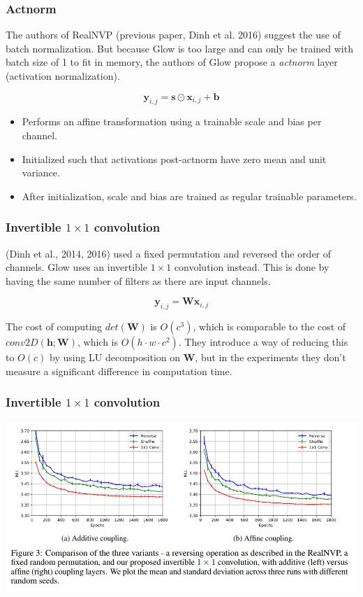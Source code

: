 \documentclass{beamer}
\begin{document}
\begin{frame}
  \frametitle{Actnorm}

  The authors of RealNVP (previous paper, Dinh et al. 2016) suggest the use of
  batch normalization. But because Glow is too large and can only be trained
  with batch size of 1 to fit in memory, the authors of Glow propose a
  \emph{actnorm} layer (activation normalization).

  \[
    \symbf{y}_{i,j} = \symbf{s} \odot \symbf{x}_{i,j} + \symbf{b}
  \]

  \begin{itemize}
    \item Performs an affine transformation using a trainable scale and bias
      per channel.

    \item Initialized such that activations post-actnorm have zero mean and
      unit variance.

    \item After initialization, scale and bias are trained as regular trainable
      parameters.
  \end{itemize}


\end{frame}

\begin{frame}
  \frametitle{Invertible $1\times1$ convolution}

  (Dinh et al., 2014, 2016) used a fixed permutation and reversed the order of
  channels. Glow uses an invertible $1\times1$ convolution instead. This is
  done by having the same number of filters as there are input channels.

  \[
    \symbf{y}_{i,j} = \symbf{W}\symbf{x}_{i,j}
  \]

  The cost of computing $det(\symbf{W})$ is $O(c^3)$, which is comparable to the cost
  of $conv2D(\symbf{h}; \symbf{W})$, which is $O(h \cdot w \cdot c^2)$. They introduce
  a way of reducing this to $O(c)$ by using LU decomposition on $\symbf{W}$, but in the
  experiments they don't measure a significant difference in computation time.
\end{frame}

\begin{frame}
  \frametitle{Invertible $1\times1$ convolution}

  \includegraphics[width=1.0\textwidth]{conv-vs-shuffle-reverse.png}
\end{frame}
\end{document}
